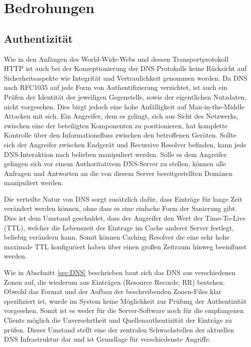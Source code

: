 \chapter{Bedrohungen}
\label{cap:threads}


\section{Authentizität}
\label{sec:Thread-Auth}

Wie in den Anfängen des World-Wide-Webs und dessen Transportprotokoll HTTP ist auch bei der Konzeptionierung der DNS Protokolls keine Rücksicht auf Sicherheitsaspekte wie Integrität und Vertraulichkeit genommen worden. Da DNS nach RFC1035 auf jede Form von Authentifizierung verzichtet, ist auch ein Prüfen der Identität der jeweiligen Gegenstelle, sowie der eigentlichen Nutzdaten, nicht vorgesehen. Dies birgt jedoch eine hohe Anfälligkeit auf Man-in-the-Middle Attacken mit sich. Ein Angreifer, dem es gelingt, sich aus Sicht des Netzwerks, zwischen eine der beteiligten Komponenten zu positionieren, hat komplette Kontrolle über den Informationsfluss zwischen den betroffenen Geräten. Sollte sich der Angreifer zwischen Endgerät und Recursive Resolver befinden, kann jede DNS-Interaktion nach belieben manipuliert werden. Solle es dem Angreifer gelingen sich vor einem Authoritativem DNS-Server zu stellen, können alle Anfragen und Antworten an die von diesem Server bereitgestellten Domänen manipuliert werden. 

Die verteilte Natur von DNS sorgt zusätzlich dafür, dass Einträge für lange Zeit verändert werden können, ohne dass es eine einfache Form der Sanierung gibt. Dies ist dem Umstand geschuldet, dass der Angreifer den Wert der Time-To-Live (TTL), welcher die Lebenszeit der Eintrage im Cache anderer Server festlegt, beliebig verändern kann. Somit können Caching Resolver die eine sehr hohe maximale TTL konfiguriert haben über einen großen Zeitraum hinweg beeinflusst werden.

Wie in Abschnitt \ref{sec:DNS} beschrieben baut sich das DNS aus verschiedenen Zonen auf, die wiederum aus Einträgen (Resource Records; RR) bestehen. Obwohl das Format und der Aufbau der beschreibenden Zonen-Files klar spezifiziert ist, wurde im System keine Möglichkeit zur Prüfung der Authentizität vorgesehen. Somit ist es weder für die Server-Software noch für die empfangenen Clients möglich die Unversehrtheit und Quellenauthentizität der Einträge zu prüfen. Dieser Umstand stellt eine der zentralen Schwachstellen der aktuellen DNS Infrastruktur dar und ist Grundlage für verschiedenste Angriffe.

